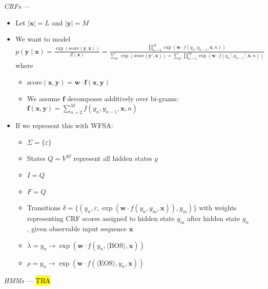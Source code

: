\emph{CRFs} --- 
\begin{itemize}
    \item Let $|\boldsymbol{x}| = L$ and $|\boldsymbol{y}| = M$
    \item We want to model 
    $
    p(\boldsymbol{y} \mid \boldsymbol{x}) = \frac{\exp(\textrm{score}(\boldsymbol{y}, \boldsymbol{x}))}{Z(\boldsymbol{x})} = \frac{\prod_{n=2}^M \exp(\boldsymbol{w} \cdot f(y_n, y_{n-1}, \boldsymbol{x}, n))}{\sum_{\boldsymbol{y}'} \exp(\textrm{score}(\boldsymbol{y}', \boldsymbol{x})) = \sum_{\boldsymbol{y}'} \prod_{n=2}^M \exp(\boldsymbol{w} \cdot f(y_n', y_{n-1}', \boldsymbol{x}, n))}
    $
    where
    \begin{itemize}
        \item $
        \textrm{score}(\boldsymbol{x}, \boldsymbol{y}) = \boldsymbol{w} \cdot \boldsymbol{f}(\boldsymbol{x}, \boldsymbol{y})
        $
        \item We assume $\boldsymbol{f}$ decomposes additively over bi-grams:
        $
        \boldsymbol{f}(\boldsymbol{x}, \boldsymbol{y}) = \sum_{n=2}^M f(y_n, y_{n-1}, \boldsymbol{x}, n)
        $
    \end{itemize}
    \item If we represent this with WFSA:
    \begin{itemize}
        \item $\Sigma = \{\varepsilon\}$
        \item States $Q = V^M$ represent all hidden states $y$
        \item $I = Q$
        \item $F = Q$
        \item Transitions $\delta = \{(y_n, \varepsilon, \exp(\boldsymbol{w} \cdot f(y_n, y_{m}, \boldsymbol{x})), y_m) \}$ with weights representing CRF scores assigned to hidden state $y_m$ after hidden state $y_n$, given observable input sequence $\boldsymbol{x}$
        \item $\lambda = y_n \to \exp(\boldsymbol{w} \cdot f(y_n, \langle \textrm{BOS} \rangle, \boldsymbol{x}))$
        \item $\rho = y_n \to \exp(\boldsymbol{w} \cdot f(\langle \textrm{EOS} \rangle, y_n, \boldsymbol{x}))$
    \end{itemize}
\end{itemize}

\emph{HMMs} --- 
\hl{TBA}

